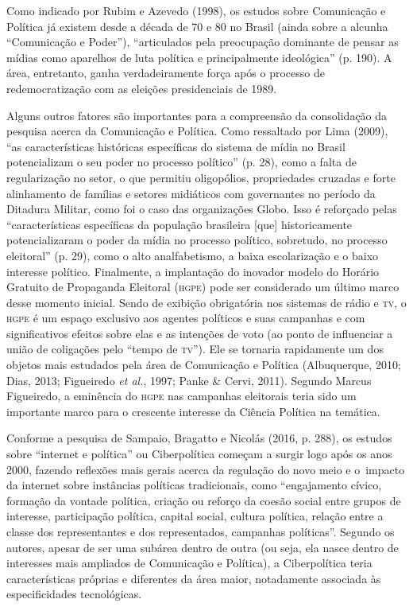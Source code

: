 Como indicado por Rubim e Azevedo (1998), os estudos sobre Comunicação e
Política já existem desde a década de 70 e 80 no Brasil (ainda sobre a
alcunha ``Comunicação e Poder''), ``articulados pela preocupação
dominante de pensar as mídias como aparelhos de luta política e
principalmente ideológica'' (p. 190). A área, entretanto, ganha
verdadeiramente força após o processo de redemocratização com as
eleições presidenciais de 1989.

Alguns outros fatores são importantes para a compreensão da consolidação
da pesquisa acerca da Comunicação e Política. Como ressaltado por Lima
(2009), ``as características históricas específicas do sistema de mídia
no Brasil potencializam o seu poder no processo político'' (p. 28), como
a falta de regularização no setor, o que permitiu oligopólios,
propriedades cruzadas e forte alinhamento de famílias e setores
midiáticos com governantes no período da Ditadura Militar, como foi o
caso das organizações Globo. Isso é reforçado pelas ``características
específicas da população brasileira {[}que{]} historicamente
potencializaram o poder da mídia no processo político, sobretudo, no
processo eleitoral'' (p. 29), como o alto analfabetismo, a baixa
escolarização e o baixo interesse político. Finalmente, a implantação do
inovador modelo do Horário Gratuito de Propaganda Eleitoral (\textsc{hgpe}) pode
ser considerado um último marco desse momento inicial. Sendo de exibição
obrigatória nos sistemas de rádio e \textsc{tv}, o \textsc{hgpe} é um espaço exclusivo aos
agentes políticos e suas campanhas e com significativos efeitos sobre
elas e as intenções de voto (ao ponto de influenciar a união de
coligações pelo ``tempo de \textsc{tv}''). Ele se tornaria rapidamente um dos
objetos mais estudados pela área de Comunicação e Política (Albuquerque,
2010; Dias, 2013; Figueiredo \emph{et al.}, 1997; Panke \& Cervi, 2011).
Segundo Marcus Figueiredo, a eminência do \textsc{hgpe} nas campanhas eleitorais
teria sido um importante marco para o crescente interesse da Ciência
Política na temática.

Conforme a pesquisa de Sampaio, Bragatto e Nicolás (2016, p. 288), os
estudos sobre ``internet e política'' ou Ciberpolítica começam a surgir
logo após os anos 2000, fazendo reflexões mais gerais acerca da
regulação do novo meio e o~impacto da internet sobre instâncias
políticas tradicionais, como ``engajamento cívico, formação da vontade
política, criação ou reforço da coesão social entre grupos de interesse,
participação política, capital social, cultura política, relação entre a
classe dos representantes e dos representados, campanhas políticas''.
Segundo os autores, apesar de ser uma subárea dentro de outra (ou seja,
ela nasce dentro de interesses mais ampliados de Comunicação e
Política), a Ciberpolítica teria características próprias e diferentes
da área maior, notadamente associada às especificidades tecnológicas.

